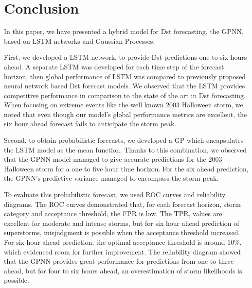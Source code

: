\section{Conclusion}


In this paper, we have presented a hybrid model for Dst forecasting, the GPNN, based on LSTM networks and Gaussian Processes. 

First, we developed a LSTM network, to provide Dst predictions one to six hours ahead. A separate LSTM was 
developed for each time step of the forecast horizon, then global performance of LSTM was compared to previously 
proposed neural network based Dst forecast models. We observed that the LSTM provides competitive performance 
in comparison to the state of the art in Dst forecasting. When focusing on extreme events like the well known 
$2003$ Halloween storm, we noted that even though our model's global performance metrics are excellent, 
the six hour ahead forecast fails to anticipate the storm peak. 

Second, to obtain probabilistic forecasts, we developed a GP which encapsulates the LSTM model as the mean function. 
Thanks to this combination, we observed that the GPNN model managed to give accurate predictions for the $2003$ 
Halloween storm for a one to five hour time horizon. For the six ahead prediction, the GPNN's predictive variance managed to encompass the storm peak. 

To evaluate this probabilistic forecast, we used ROC curves and reliability diagrams. The ROC curves demonstrated that, 
for each forecast horizon, storm category and acceptance threshold, the FPR is low. The TPR, values are excellent 
for moderate and intense storms, but for six hour ahead prediction of superstorms, misjudgment is possible when 
the acceptance threshold increased. For six hour ahead prediction, the optimal acceptance threshold is around 
$10\%$, which evidenced room for further improvement. The reliability diagram showed that the GPNN provides 
great performance for predictions from one to three ahead, but for four to six hours ahead, an overestimation of 
storm likelihoods is possible.


